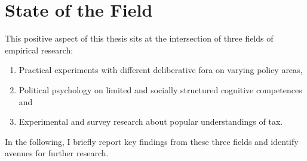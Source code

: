 \section{State of the Field}
This positive aspect of this thesis sits at the intersection of three fields of empirical research: 
\begin{enumerate}
	\item Practical experiments with different deliberative fora on varying policy areas,
	\item Political psychology on limited and socially structured cognitive competences and
	\item Experimental and survey research about popular understandings of tax.
\end{enumerate}

In the following, I briefly report key findings from these three fields and identify avenues for further research.

